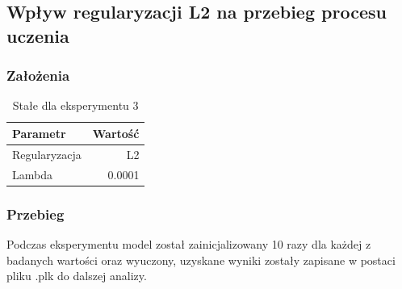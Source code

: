 \documentclass{article}
\begin{document}
\newpage
\subsection{Wpływ regularyzacji L2 na przebieg procesu uczenia}
\subsubsection*{Założenia}
\begin{table}[H]
	\caption{Stałe dla eksperymentu 3}
	\label{tabela-const-3}
	\centering
	\begin{tabular}{lr}
		\toprule
		Parametr      & Wartość \\
		\midrule
		Regularyzacja & L2        \\
		Lambda        & 0.0001    \\
		\bottomrule
	\end{tabular}
\end{table}

\subsubsection*{Przebieg}

Podczas eksperymentu model został zainicjalizowany 10 razy dla każdej z badanych wartości oraz wyuczony, uzyskane wyniki zostały zapisane w postaci pliku .plk do dalszej analizy.
\end{document}
